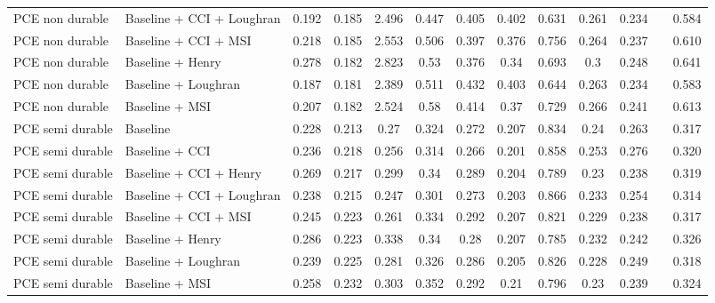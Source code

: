 \begin{table}[H]
{\begin{tabular}{llcccccccccp{1ex}c}
PCE non durable	&	Baseline + CCI + Loughran	&	0.192	&	0.185	&	2.496	&	\cellcolor{green!25}0.447	&	0.405	&	0.402	&	0.631	&	\cellcolor{green!25}0.261	&	0.234	&&	0.584	\\
PCE non durable	&	Baseline + CCI + MSI	&	0.218	&	0.185	&	2.553	&	0.506	&	0.397	&	0.376	&	\cellcolor{red!25}0.756	&	0.264	&	0.237	&&	0.610	\\
PCE non durable	&	Baseline + Henry	&	\cellcolor{red!25}0.278	&	0.182	&	2.823	&	0.53	&	0.376	&	\cellcolor{green!25}0.34	&	0.693	&	0.3	&	\cellcolor{red!25}0.248	&&	\cellcolor{red!25}0.641\\
PCE non durable	&	Baseline + Loughran	&	\cellcolor{green!25}0.187	&	\cellcolor{green!25}0.181	&	\cellcolor{green!25}2.389	&	0.511	&	\cellcolor{red!25}0.432	&	\cellcolor{red!25}0.403	&	0.644	&	0.263	&	\cellcolor{green!25}0.234	&&	0.583	\\
PCE non durable	&	Baseline + MSI	&	0.207	&	0.182	&	2.524	&	\cellcolor{red!25}0.58	&	0.414	&	0.37	&	0.729	&	0.266	&	0.241	&&	0.613	\\
\hdashline 																							
PCE semi durable	&	Baseline	&	\cellcolor{green!25}0.228	&	\cellcolor{green!25}0.213	&	0.27	&	0.324	&	0.272	&	0.207	&	0.834	&	0.24	&	0.263	&&	0.317	\\
PCE semi durable	&	Baseline + CCI	&	0.236	&	0.218	&	0.256	&	0.314	&	\cellcolor{green!25}0.266	&	\cellcolor{green!25}0.201	&	0.858	&	\cellcolor{red!25}0.253	&	\cellcolor{red!25}0.276	&&	0.320	\\
PCE semi durable	&	Baseline + CCI + Henry	&	0.269	&	0.217	&	0.299	&	0.34	&	0.289	&	0.204	&	0.789	&	0.23	&	\cellcolor{green!25}0.238	&&	0.319	\\
PCE semi durable	&	Baseline + CCI + Loughran	&	0.238	&	0.215	&	\cellcolor{green!25}0.247	&	\cellcolor{green!25}0.301	&	0.273	&	0.203	&	\cellcolor{red!25}0.866	&	0.233	&	0.254	&&	\cellcolor{green!25}0.314\\
PCE semi durable	&	Baseline + CCI + MSI	&	0.245	&	0.223	&	0.261	&	0.334	&	0.292	&	0.207	&	0.821	&	0.229	&	0.238	&&	0.317	\\
PCE semi durable	&	Baseline + Henry	&	\cellcolor{red!25}0.286	&	0.223	&	\cellcolor{red!25}0.338	&	0.34	&	0.28	&	0.207	&	\cellcolor{green!25}0.785	&	0.232	&	0.242	&&	\cellcolor{red!25}0.326\\
PCE semi durable	&	Baseline + Loughran	&	0.239	&	0.225	&	0.281	&	0.326	&	0.286	&	0.205	&	0.826	&	\cellcolor{green!25}0.228	&	0.249	&&	0.318	\\
PCE semi durable	&	Baseline + MSI	&	0.258	&	\cellcolor{red!25}0.232	&	0.303	&	\cellcolor{red!25}0.352	&	\cellcolor{red!25}0.292	&	\cellcolor{red!25}0.21	&	0.796	&	0.23	&	0.239	&&	0.324	\\

\end{tabular}}
\end{table}
